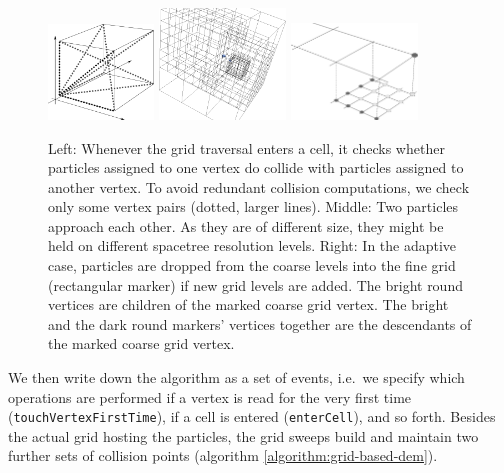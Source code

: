 \documentclass[times,12pt]{article}
\begin{document}
\begin{figure}
  \begin{center}
    \includegraphics[width=0.25\textwidth]{sketches/collision-cube.pdf}
    \hspace{0.2cm}
    \includegraphics[width=0.3\textwidth]{experiments/two-bodies/visualisation/adaptive-grid01.png}
    \hspace{0.2cm}
    \includegraphics[width=0.3\textwidth]{sketches/multigrid.pdf}
  \end{center}
  \caption{
    Left: Whenever the grid traversal enters a cell, it checks whether particles
    assigned to one vertex do collide with particles assigned to another vertex.
    To avoid redundant collision computations, we check only some vertex pairs
    (dotted, larger lines).
    Middle: Two particles approach each other. As they are of different size,
    they might be held on different spacetree resolution levels.
    Right: In the adaptive case, particles are dropped from the coarse levels
    into the fine grid (rectangular marker) if new grid levels are added. The
    bright round vertices are children of the marked coarse grid vertex. The
    bright and the dark round markers' vertices together are the descendants of
    the marked coarse grid vertex.
  }
  \label{figure:collision-cube}
\end{figure}

We then write down the algorithm as a set of events, i.e.~we specify which
operations are performed if a vertex is read for the very first time \linebreak
(\texttt{touchVertexFirstTime}), if a cell is entered
(\texttt{enterCell}), and so forth.
Besides the actual grid hosting the particles, the grid sweeps build and
maintain two further sets of collision points (algorithm \ref{algorithm:grid-based-dem}).
\end{document}
